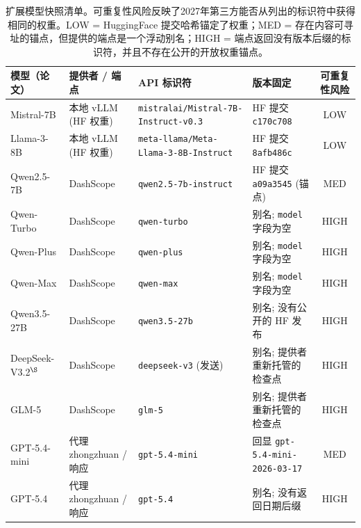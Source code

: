 \documentclass[11pt,a4paper,fontset=fandol]{ctexart}
\begin{document}
\begin{table}[h]
\centering
\caption{扩展模型快照清单。可重复性风险反映了2027年第三方能否从列出的标识符中获得相同的权重。LOW = HuggingFace 提交哈希锚定了权重；MED = 存在内容可寻址的锚点，但提供的端点是一个浮动别名；HIGH = 端点返回没有版本后缀的标识符，并且不存在公开的开放权重锚点。}
\label{tab:api_versions_extended}
\vspace{0.5em}
\scriptsize
\begin{tabular}{@{}llllc@{}}
\toprule
\textbf{模型（论文）} & \textbf{提供者 / 端点} & \textbf{API 标识符} & \textbf{版本固定} & \textbf{可重复性风险} \\
\midrule
Mistral-7B          & 本地 vLLM (HF 权重)               & \texttt{mistralai/Mistral-7B-Instruct-v0.3} & HF 提交 \texttt{c170c708} & LOW  \\
Llama-3-8B          & 本地 vLLM (HF 权重)               & \texttt{meta-llama/Meta-Llama-3-8B-Instruct} & HF 提交 \texttt{8afb486c} & LOW  \\
Qwen2.5-7B          & DashScope                             & \texttt{qwen2.5-7b-instruct}                 & HF 提交 \texttt{a09a3545} (锚点) & MED  \\
\midrule
Qwen-Turbo          & DashScope                             & \texttt{qwen-turbo}                          & 别名; \texttt{model} 字段为空  & HIGH \\
Qwen-Plus           & DashScope                             & \texttt{qwen-plus}                           & 别名; \texttt{model} 字段为空  & HIGH \\
Qwen-Max            & DashScope                             & \texttt{qwen-max}                            & 别名; \texttt{model} 字段为空  & HIGH \\
Qwen3.5-27B         & DashScope                             & \texttt{qwen3.5-27b}                         & 别名; 没有公开的 HF 发布       & HIGH \\
DeepSeek-V3.2$^\S$  & DashScope                             & \texttt{deepseek-v3} (发送)                  & 别名; 提供者重新托管的检查点     & HIGH \\
GLM-5               & DashScope                             & \texttt{glm-5}                               & 别名; 提供者重新托管的检查点     & HIGH \\
\midrule
GPT-5.4-mini        & 代理 zhongzhuan / 响应           & \texttt{gpt-5.4-mini}                        & 回显 \texttt{gpt-5.4-mini-2026-03-17}  & MED  \\
GPT-5.4             & 代理 zhongzhuan / 响应           & \texttt{gpt-5.4}                             & 别名; 没有返回日期后缀    & HIGH \\

\end{tabular}
\end{table}
\end{document}
